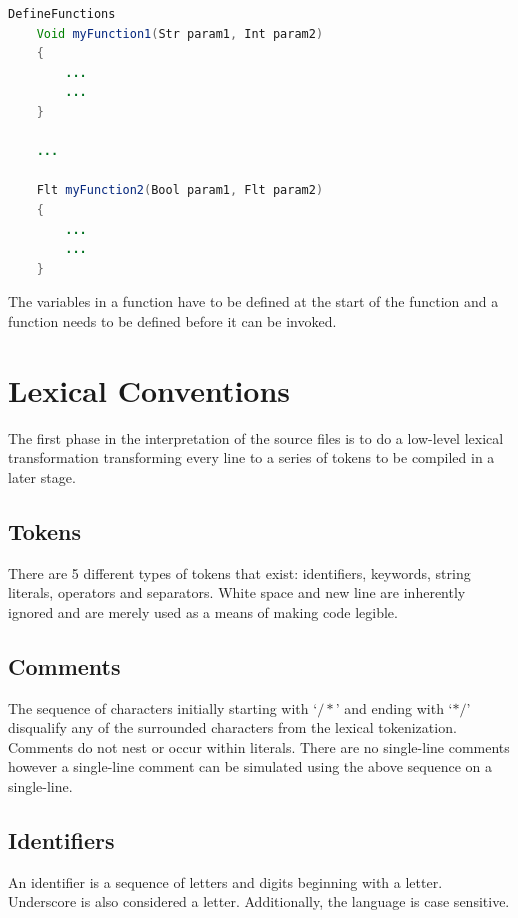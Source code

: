 \documentclass[12pt]{report}
\begin{document}
\begin{singlespace}
\begin{lstlisting}[language=Java,label=some-code,caption={Defining functions.}]
DefineFunctions
	Void myFunction1(Str param1, Int param2)
	{
		...
		...
	}

	...

	Flt myFunction2(Bool param1, Flt param2)
	{
		...
		...
	}
\end{lstlisting}
\end{singlespace}

The variables in a function have to be defined at the start of the function and a function needs to be defined before it can be invoked. 

\section{Lexical Conventions}

The first phase in the interpretation of the source files is to do a low-level lexical transformation transforming every line to a series of tokens to be compiled in a later stage.

\subsection{Tokens}

There are 5 different types of tokens that exist: identifiers, keywords, string literals, operators and separators. White space and new line are inherently ignored and are merely used as a means of making code legible.

\subsection{Comments}

The sequence of characters initially starting with `$/*$' and ending with `$*/$' disqualify any of the surrounded characters from the lexical tokenization. Comments do not nest or occur within literals. There are no single-line comments however a single-line comment can be simulated using the above sequence on a single-line.

\subsection{Identifiers}

An identifier is a sequence of letters and digits beginning with a letter. Underscore is also considered a letter. Additionally, the language is case sensitive.
\end{document}

